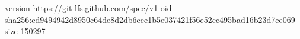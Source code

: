 version https://git-lfs.github.com/spec/v1
oid sha256:cd9494942d8950c64de8d2db6eee1b5e037421f56e52cc495bad16b23d7ee069
size 150297
